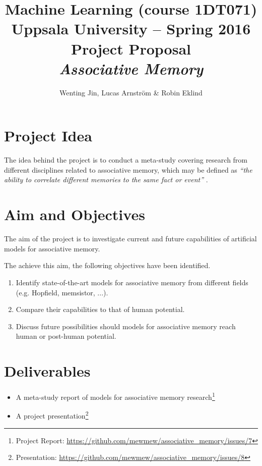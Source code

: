 \documentclass[12pt, a4paper]{article}
\title{\textbf{Machine Learning (course 1DT071) \\
    Uppsala University -- Spring 2016 \\
    Project Proposal \\
    \textit{Associative Memory}
  }
}
\author{Wenting Jin, Lucas Arnström \& Robin Eklind}
\begin{document}
\maketitle



\section{Project Idea} %



The idea behind the project is to conduct a meta-study covering research from different disciplines related to associative memory, which may be defined as \textit{``the ability to correlate different memories to the same fact or event''} \cite{memsistor}.

\section{Aim and Objectives}

The aim of the project is to investigate current and future capabilities of artificial models for associative memory.

The achieve this aim, the following objectives have been identified.

\begin{enumerate}
	\item Identify state-of-the-art models for associative memory from different fields (e.g. Hopfield, memsistor, ...).
	\item Compare their capabilities to that of human potential.
	\item Discuss future possibilities should models for associative memory reach human or post-human potential.
\end{enumerate}

\section{Deliverables}

\begin{itemize}
	\item A meta-study report of models for associative memory research\footnote{Project Report: \url{https://github.com/mewmew/associative_memory/issues/7}}
	\item A project presentation\footnote{Presentation: \url{https://github.com/mewmew/associative_memory/issues/8}}
\end{itemize}
\end{document}
